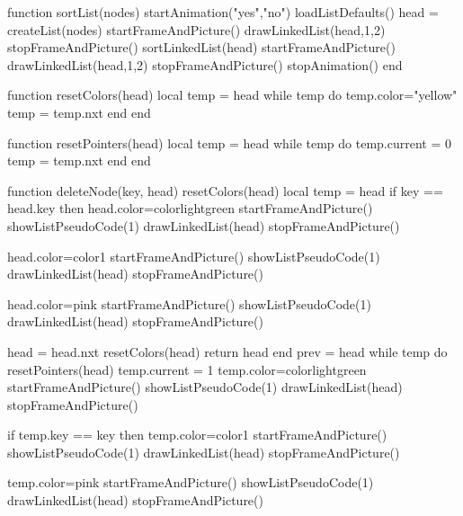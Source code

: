 function sortList(nodes)
	startAnimation("yes","no")
	loadListDefaults()
	head = createList(nodes)
	startFrameAndPicture()
	drawLinkedList(head,1,2)
	stopFrameAndPicture()
	sortLinkedList(head)
	startFrameAndPicture()
	drawLinkedList(head,1,2)
	stopFrameAndPicture()
	stopAnimation()
end

function resetColors(head)
	local temp = head
	while temp do
		temp.color="yellow"
		temp = temp.nxt
	end
end

function resetPointers(head)
	local temp = head
	while temp do
		temp.current = 0
		temp = temp.nxt
	end
end

function deleteNode(key, head)
	resetColors(head)
	local temp = head
	if key == head.key then
		head.color=colorlightgreen
		startFrameAndPicture()
		showListPseudoCode(1)
		drawLinkedList(head)
		stopFrameAndPicture()

		head.color=color1
		startFrameAndPicture()
		showListPseudoCode(1)
		drawLinkedList(head)
		stopFrameAndPicture()

		head.color=pink
		startFrameAndPicture()
		showListPseudoCode(1)
		drawLinkedList(head)
		stopFrameAndPicture()

		head = head.nxt
		resetColors(head)
		return head
	end
	prev = head
	while temp do
		resetPointers(head)
		temp.current = 1
		temp.color=colorlightgreen
		startFrameAndPicture()
		showListPseudoCode(1)
		drawLinkedList(head)
		stopFrameAndPicture()

		if temp.key == key then
			temp.color=color1
			startFrameAndPicture()
			showListPseudoCode(1)
			drawLinkedList(head)
			stopFrameAndPicture()
	
			temp.color=pink
			startFrameAndPicture()
			showListPseudoCode(1)
			drawLinkedList(head)
			stopFrameAndPicture()

